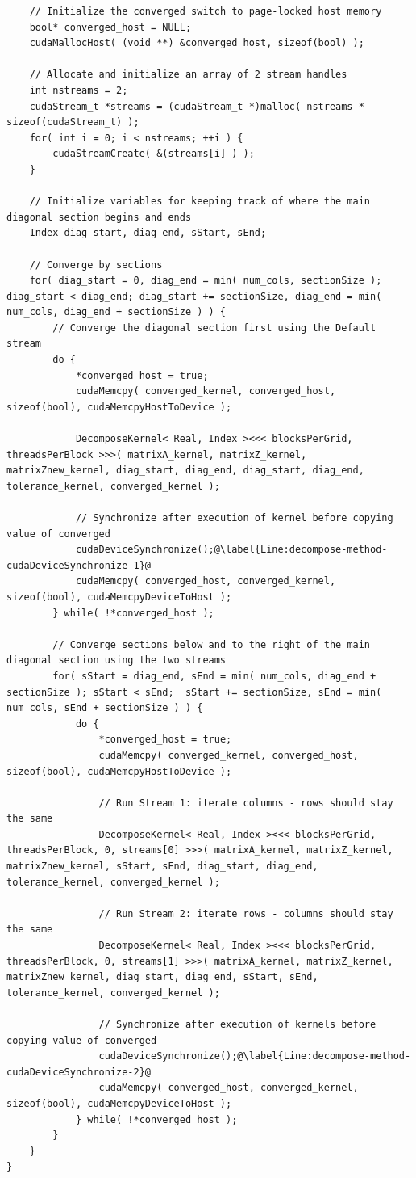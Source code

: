 \begin{lstlisting}
	// Initialize the converged switch to page-locked host memory
	bool* converged_host = NULL;
	cudaMallocHost( (void **) &converged_host, sizeof(bool) );
	
	// Allocate and initialize an array of 2 stream handles
	int nstreams = 2;
	cudaStream_t *streams = (cudaStream_t *)malloc( nstreams * sizeof(cudaStream_t) );
	for( int i = 0; i < nstreams; ++i ) {
		cudaStreamCreate( &(streams[i] ) );
	}
	
	// Initialize variables for keeping track of where the main diagonal section begins and ends
	Index diag_start, diag_end, sStart, sEnd;
	
	// Converge by sections
	for( diag_start = 0, diag_end = min( num_cols, sectionSize ); diag_start < diag_end; diag_start += sectionSize, diag_end = min( num_cols, diag_end + sectionSize ) ) {
		// Converge the diagonal section first using the Default stream
		do {
			*converged_host = true;
			cudaMemcpy( converged_kernel, converged_host, sizeof(bool), cudaMemcpyHostToDevice );
			
			DecomposeKernel< Real, Index ><<< blocksPerGrid, threadsPerBlock >>>( matrixA_kernel, matrixZ_kernel, matrixZnew_kernel, diag_start, diag_end, diag_start, diag_end, tolerance_kernel, converged_kernel );
			
			// Synchronize after execution of kernel before copying value of converged
			cudaDeviceSynchronize();@\label{Line:decompose-method-cudaDeviceSynchronize-1}@
			cudaMemcpy( converged_host, converged_kernel, sizeof(bool), cudaMemcpyDeviceToHost );
		} while( !*converged_host );
		
		// Converge sections below and to the right of the main diagonal section using the two streams
		for( sStart = diag_end, sEnd = min( num_cols, diag_end + sectionSize );	sStart < sEnd;	sStart += sectionSize, sEnd = min( num_cols, sEnd + sectionSize ) ) {
			do {
				*converged_host = true;
				cudaMemcpy( converged_kernel, converged_host, sizeof(bool), cudaMemcpyHostToDevice );
				
				// Run Stream 1: iterate columns - rows should stay the same
				DecomposeKernel< Real, Index ><<< blocksPerGrid, threadsPerBlock, 0, streams[0] >>>( matrixA_kernel, matrixZ_kernel, matrixZnew_kernel, sStart, sEnd, diag_start, diag_end, tolerance_kernel, converged_kernel );
				
				// Run Stream 2: iterate rows - columns should stay the same
				DecomposeKernel< Real, Index ><<< blocksPerGrid, threadsPerBlock, 0, streams[1] >>>( matrixA_kernel, matrixZ_kernel, matrixZnew_kernel, diag_start, diag_end, sStart, sEnd, tolerance_kernel, converged_kernel );
				
				// Synchronize after execution of kernels before copying value of converged
				cudaDeviceSynchronize();@\label{Line:decompose-method-cudaDeviceSynchronize-2}@
				cudaMemcpy( converged_host, converged_kernel, sizeof(bool), cudaMemcpyDeviceToHost );
			} while( !*converged_host );
		}
	}
}
\end{lstlisting}

